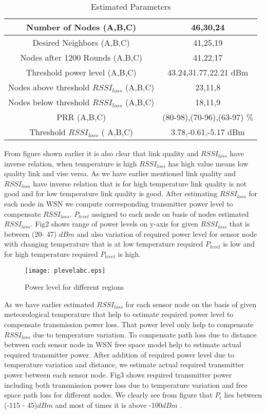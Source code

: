 \documentclass{article}
\begin{document}
\begin{table}[h!]
  \centering
  \caption{Estimated Parameters}
  \tiny
  \begin{tabular}{|c|c|}\hline
    Number of Nodes (A,B,C)   & 46,30,24 \\ \hline
    Desired Neighbors  (A,B,C)   & 41,25,19 \\ \hline
     Nodes after 1200 Rounds (A,B,C) & 41,22,17 \\ \hline
    Threshold power level (A,B,C)  & 43.24,31.77,22.21 dBm \\ \hline
    Nodes above threshold $RSSI_{loss}$ (A,B,C)  & 23,11,8 \\ \hline
    Nodes below threshold $RSSI_{loss}$ (A,B,C)   & 18,11,9 \\ \hline
    PRR (A,B,C) & (80-98),(70-96),(63-97) $\%$ \\ \hline
    Threshold $RSSI_{loss}$ ( A,B,C) & 3.78,-0.61,-5.17 dBm \\\hline
    \end{tabular}\label{tab:addlabel}\end{table}
From figure shown earlier it is also clear that link quality and $RSSI_{loss}$ have inverse relation, when temperature is high $RSSI_{loss}$ has high value means low quality link and vise versa. As we have earlier mentioned link quality and $RSSI_{loss}$ have inverse relation that is for high temperature link quality is not good and for low temperature link quality is good. After estimating $RSSI_{loss}$ for each node in WSN we compute corresponding transmitter power level to compensate $RSSI_{loss}$. $P_{level}$ assigned to each node on basis of nodes estimated $RSSI_{loss}$. Fig2 shows range of power levels on y-axis for given $RSSI_{loss}$ that is between (20- 47) $dBm$ and also variation of required power level for sensor node with changing temperature that is at low temperature required $P_{level}$ is low and for high temperature required $P_{level}$ is high.

\begin{figure}[h]
\begin{center}
\texttt{[image: plevelabc.eps]}
\vspace{-0.5cm}
\caption{ Power level  for different regions}
\end{center}
\end{figure}

As we have earlier estimated $RSSI_{loss}$ for each sensor node on the basis of given meteorological temperature that help to estimate required power level to compensate transmission power loss. That power level only help to compensate $RSSI_{loss}$ due to temperature variation. To compensate path loss due to distance  between each sensor node in WSN free space model help to estimate actual required transmitter power. After addition of required power level due to temperature variation and distance, we estimate actual required transmitter power between each sensor node. Fig3 shows required transmitter power including both transmission power loss due to temperature variation and free space path loss for different nodes. We clearly see from figure that $P_{t}$ lies between (-115 - 45)$dBm$ and most of times it is above -100$dBm$ .
\end{document}
